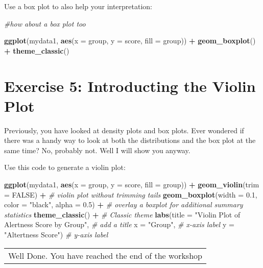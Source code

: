 \documentclass[
]{book}
\newenvironment{Shaded}{\begin{snugshade}}{\end{snugshade}}
\newcommand{\AttributeTok}[1]{\textcolor[rgb]{0.13,0.29,0.53}{#1}}
\newcommand{\CommentTok}[1]{\textcolor[rgb]{0.56,0.35,0.01}{\textit{#1}}}
\newcommand{\ConstantTok}[1]{\textcolor[rgb]{0.56,0.35,0.01}{#1}}
\newcommand{\FloatTok}[1]{\textcolor[rgb]{0.00,0.00,0.81}{#1}}
\newcommand{\FunctionTok}[1]{\textcolor[rgb]{0.13,0.29,0.53}{\textbf{#1}}}
\newcommand{\NormalTok}[1]{#1}
\newcommand{\SpecialCharTok}[1]{\textcolor[rgb]{0.81,0.36,0.00}{\textbf{#1}}}
\newcommand{\StringTok}[1]{\textcolor[rgb]{0.31,0.60,0.02}{#1}}
\let\oldsection\section
\renewcommand{\section}{\needspace{5\baselineskip}\oldsection}
\begin{document}
Use a box plot to also help your interpretation:

\begin{Shaded}
\begin{Highlighting}[]
\CommentTok{\#how about a box plot too}

\FunctionTok{ggplot}\NormalTok{(mydata1, }\FunctionTok{aes}\NormalTok{(}\AttributeTok{x =}\NormalTok{ group, }\AttributeTok{y =}\NormalTok{ score, }\AttributeTok{fill =}\NormalTok{ group)) }\SpecialCharTok{+}
  \FunctionTok{geom\_boxplot}\NormalTok{() }\SpecialCharTok{+}
  \FunctionTok{theme\_classic}\NormalTok{()}
\end{Highlighting}
\end{Shaded}

\section{Exercise 5: Introducting the Violin Plot}\label{exercise-5-introducting-the-violin-plot}

Previously, you have looked at density plots and box plots. Ever wondered if there was a handy way to look at both the distributions and the box plot at the same time? No, probably not. Well I will show you anyway.

Use this code to generate a violin plot:

\begin{Shaded}
\begin{Highlighting}[]
\FunctionTok{ggplot}\NormalTok{(mydata1, }\FunctionTok{aes}\NormalTok{(}\AttributeTok{x =}\NormalTok{ group, }\AttributeTok{y =}\NormalTok{ score, }\AttributeTok{fill =}\NormalTok{ group)) }\SpecialCharTok{+}
  \FunctionTok{geom\_violin}\NormalTok{(}\AttributeTok{trim =} \ConstantTok{FALSE}\NormalTok{) }\SpecialCharTok{+}  \CommentTok{\# violin plot without trimming tails}
  \FunctionTok{geom\_boxplot}\NormalTok{(}\AttributeTok{width =} \FloatTok{0.1}\NormalTok{, }\AttributeTok{color =} \StringTok{"black"}\NormalTok{, }\AttributeTok{alpha =} \FloatTok{0.5}\NormalTok{) }\SpecialCharTok{+}  \CommentTok{\# overlay a boxplot for additional summary statistics}
  \FunctionTok{theme\_classic}\NormalTok{() }\SpecialCharTok{+}  \CommentTok{\# Classic theme}
  \FunctionTok{labs}\NormalTok{(}\AttributeTok{title =} \StringTok{"Violin Plot of Alertness Score by Group"}\NormalTok{,  }\CommentTok{\# add a title}
       \AttributeTok{x =} \StringTok{"Group"}\NormalTok{,  }\CommentTok{\# x{-}axis label}
       \AttributeTok{y =} \StringTok{"Altertness Score"}\NormalTok{)  }\CommentTok{\# y{-}axis label}
\end{Highlighting}
\end{Shaded}

\begin{longtable}[]{@{}l@{}}
\toprule\noalign{}
\endhead
\bottomrule\noalign{}
\endlastfoot
Well Done. You have reached the end of the workshop \\
\end{longtable}


\end{document}
